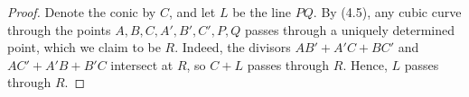 \documentclass[a4paper]{article}
\begin{document}
\begin{enumerate} [label=\textbf{\arabic*.}, leftmargin=0em]
            \begin{proof}
                  Denote the conic by $C$, and let $L$ be the line $PQ$.
                  By (4.5), any cubic curve through the points $A, B, C, A', B', C', P, Q$ passes through a uniquely determined point, which we claim to be $R$.
                  Indeed, the divisors $AB' + A'C + BC'$ and $AC' + A'B + B'C$ intersect at $R$, so $C + L$ passes through $R$.
                  Hence, $L$ passes through $R$.
            \end{proof}





\end{enumerate}
\end{document}
